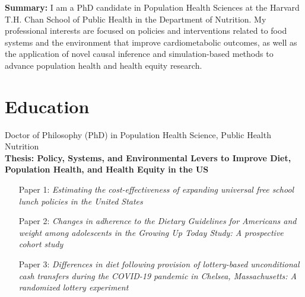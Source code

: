 \documentclass{cv_style}
\begin{document}
\begin{center}
\end{center}


\begin{adjustwidth}{0.7cm}{0.7cm} \parskip 8pt \begin{small} \textbf{Summary:} I am a PhD candidate in Population Health Sciences at the Harvard T.H. Chan School of Public Health in the Department of Nutrition. My professional interests are focused on policies and interventions related to food systems and the environment that improve cardiometabolic outcomes, as well as the application of novel causal inference and simulation-based methods to advance population health and health equity research.  
\end{small}
\end{adjustwidth}


\parskip -5pt 
\section{Education}
\parskip -5pt
\parskip -4pt \noindent Doctor of Philosophy (PhD) in Population Health Science, Public Health Nutrition \\
\textbf{Thesis: Policy, Systems, and Environmental Levers to Improve Diet, Population Health, and Health Equity in the US}\\

\vspace{-1em}
    \begingroup
    \addtolength{\leftmargini}{3em} \begin{itemize}
        \item[\hspace{1em}Paper 1:] \textit{Estimating the cost-effectiveness of expanding universal free school lunch policies in the United States} \vspace{0.8em}
        \item [\hspace{1em}Paper 2:] \textit{Changes in adherence to the Dietary Guidelines for Americans and weight among adolescents in the Growing Up Today Study: A prospective cohort study} \vspace{0.8em} 
        \item [\hspace{1em}Paper 3:] \textit{Differences in diet following provision of lottery-based unconditional cash transfers during the COVID-19 pandemic in Chelsea, Massachusetts: A randomized lottery experiment}
    \end{itemize}
    \endgroup
\end{document}
